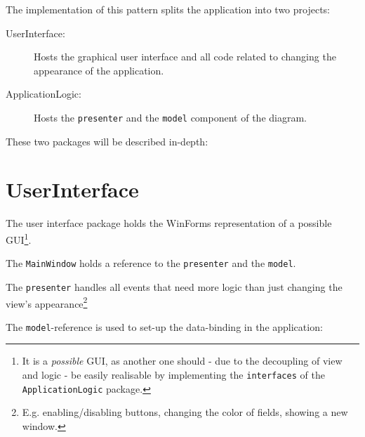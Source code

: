 The implementation of this pattern splits the application into two projects:
\begin{description}
\item[UserInterface:] Hosts the graphical user interface and all code related to changing the appearance of the application.
\item[ApplicationLogic:] Hosts the \texttt{presenter} and the \texttt{model} component of the diagram.
\end{description}

These two packages will be described in-depth:

\section{UserInterface}
\label{sec:user_interface}

The user interface package holds the WinForms representation of a possible \ac{GUI}\footnote{It is a \textit{possible} \ac{GUI}, as  another one should - due to the decoupling of view and logic - be easily realisable by implementing the \texttt{interfaces} of the \texttt{ApplicationLogic} package.}.

The \texttt{MainWindow} holds a reference to the \texttt{presenter} and the \texttt{model}.

The \texttt{presenter} handles all events that need more logic than just changing the view's appearance\footnote{E.g. enabling/disabling buttons, changing the color of fields, showing a new window.}

The \texttt{model}-reference is used to set-up the data-binding in the application:

